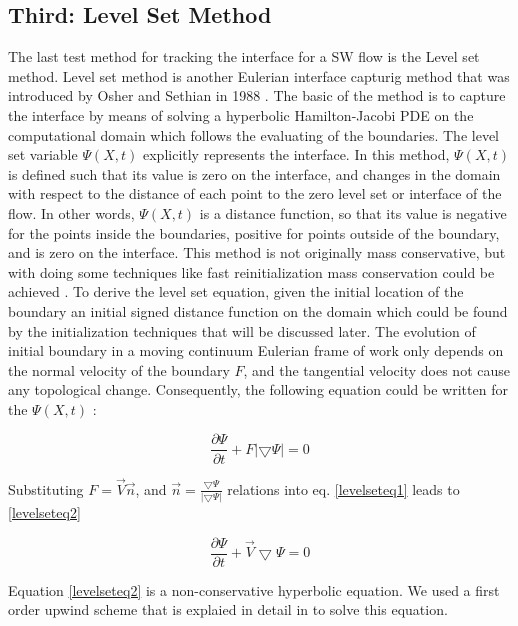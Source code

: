 \documentclass[letterpaper,10pt]{article}
\begin{document}
\subsection{Third: Level Set Method} \label{level set}

The last test method for tracking the interface for a SW flow is the Level set method.
Level set method is another Eulerian interface capturig method that was introduced by Osher and Sethian in 1988 \cite{}.
The basic of the method is to capture the interface by means of solving a hyperbolic Hamilton-Jacobi PDE on 
the computational domain which follows the evaluating of the boundaries. The level set variable $\varPsi (X,t)$ explicitly 
represents the interface. In this method, $\varPsi (X,t)$ is defined such that its value is zero on the interface, and 
changes in the domain with respect to the distance of each point to the zero level set or interface of the flow. 
In other words, $\varPsi (X,t)$  is a distance function, so that its value is negative for the points inside the boundaries, 
positive for points outside of the boundary, and is zero on the interface. 
This method is not originally mass conservative, but with doing some 
techniques like fast reinitialization mass conservation could be achieved \cite{}. 
To derive the level set equation, given the initial location of the boundary an initial signed distance function on 
the domain which could be found by the initialization techniques that will be discussed later. The evolution of initial 
boundary in a moving continuum Eulerian frame of work only depends on the normal velocity of the boundary $F$, 
and the tangential velocity does not cause any topological change. Consequently, the following equation could 
be written for the $\varPsi (X,t)$ :

\begin{equation}\label{levelseteq1}
 \frac{\partial \varPsi}{\partial t} + F |\bigtriangledown \varPsi| = 0
\end{equation}

Substituting $F = \overrightarrow{V} \overrightarrow{n} $, and 
$\overrightarrow{n} = \frac{\bigtriangledown \varPsi}{|\bigtriangledown \varPsi|}$
relations into eq. \eqref{levelseteq1} leads to \eqref{levelseteq2}

\begin{equation}\label{levelseteq2}
 \frac{\partial \varPsi}{\partial t} + \overrightarrow{V} \bigtriangledown \varPsi = 0
\end{equation}

Equation \eqref{levelseteq2} is a non-conservative hyperbolic equation. We used a first order upwind scheme  that is 
explaied in detail in \cite{} to solve this equation. 
\end{document}
